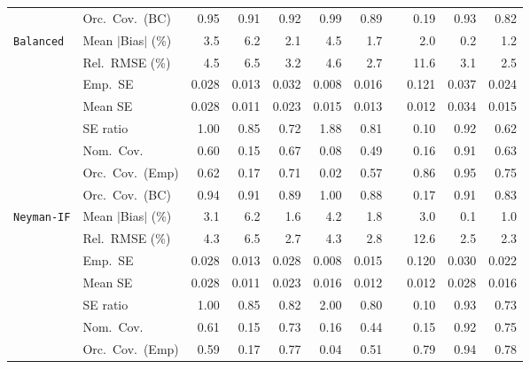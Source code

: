 \begin{landscape}
\begin{longtable}{llrrrrrrrrr}
 & Orc.\ Cov.\ (BC) & \cellcolor{rankone}0.95 & 0.91 & \cellcolor{rankthree}0.92 & 0.99 & 0.89 &  & 0.19 & \cellcolor{ranktwo}0.93 & 0.82 \\
\addlinespace[2pt]
\quad \texttt{Balanced} & Mean $|$Bias$|$ (\%) & 3.5 & 6.2 & 2.1 & 4.5 & \cellcolor{rankthree}1.7 &  & 2.0 & \cellcolor{rankone}0.2 & \cellcolor{ranktwo}1.2 \\
 & Rel.\ RMSE (\%) & 4.5 & 6.5 & 3.2 & 4.6 & \cellcolor{ranktwo}2.7 &  & 11.6 & \cellcolor{rankthree}3.1 & \cellcolor{rankone}2.5 \\
 & Emp.\ SE & 0.028 & 0.013 & 0.032 & 0.008 & 0.016 &  & 0.121 & 0.037 & 0.024 \\
 & Mean SE & 0.028 & 0.011 & 0.023 & 0.015 & 0.013 &  & 0.012 & 0.034 & 0.015 \\
 & SE ratio & \cellcolor{rankone}1.00 & \cellcolor{rankthree}0.85 & 0.72 & 1.88 & 0.81 &  & 0.10 & \cellcolor{ranktwo}0.92 & 0.62 \\
 & Nom.\ Cov. & 0.60 & 0.15 & \cellcolor{ranktwo}0.67 & 0.08 & 0.49 &  & 0.16 & \cellcolor{rankone}0.91 & \cellcolor{rankthree}0.63 \\
 & Orc.\ Cov.\ (Emp) & 0.62 & 0.17 & 0.71 & 0.02 & 0.57 &  & \cellcolor{ranktwo}0.86 & \cellcolor{rankone}0.95 & \cellcolor{rankthree}0.75 \\
 & Orc.\ Cov.\ (BC) & \cellcolor{rankone}0.94 & \cellcolor{ranktwo}0.91 & 0.89 & \cellcolor{rankthree}1.00 & 0.88 &  & 0.17 & \cellcolor{ranktwo}0.91 & 0.83 \\
\addlinespace[2pt]
\quad \texttt{Neyman-IF} & Mean $|$Bias$|$ (\%) & 3.1 & 6.2 & \cellcolor{rankthree}1.6 & 4.2 & 1.8 &  & 3.0 & \cellcolor{rankone}0.1 & \cellcolor{ranktwo}1.0 \\
 & Rel.\ RMSE (\%) & 4.3 & 6.5 & \cellcolor{rankthree}2.7 & 4.3 & 2.8 &  & 12.6 & \cellcolor{ranktwo}2.5 & \cellcolor{rankone}2.3 \\
 & Emp.\ SE & 0.028 & 0.013 & 0.028 & 0.008 & 0.015 &  & 0.120 & 0.030 & 0.022 \\
 & Mean SE & 0.028 & 0.011 & 0.023 & 0.016 & 0.012 &  & 0.012 & 0.028 & 0.016 \\
 & SE ratio & \cellcolor{rankone}1.00 & \cellcolor{rankthree}0.85 & 0.82 & 2.00 & 0.80 &  & 0.10 & \cellcolor{ranktwo}0.93 & 0.73 \\
 & Nom.\ Cov. & 0.61 & 0.15 & \cellcolor{rankthree}0.73 & 0.16 & 0.44 &  & 0.15 & \cellcolor{rankone}0.92 & \cellcolor{ranktwo}0.75 \\
 & Orc.\ Cov.\ (Emp) & 0.59 & 0.17 & 0.77 & 0.04 & 0.51 &  & \cellcolor{ranktwo}0.79 & \cellcolor{rankone}0.94 & \cellcolor{rankthree}0.78 \\

\end{longtable}
\end{landscape}
